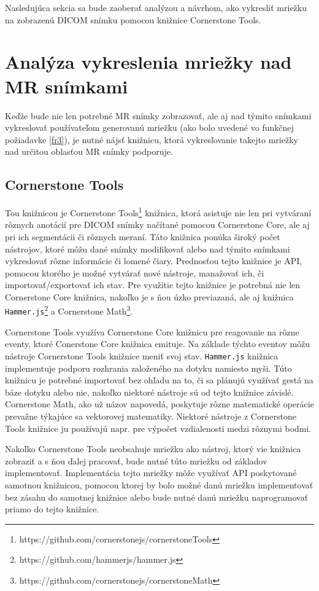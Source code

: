 Nasledujúca sekcia sa bude zaoberať analýzou a návrhom, ako vykresliť mriežku na zobrazenú DICOM snímku pomocou knižnice Cornerstone Tools.

\section {Analýza vykreslenia mriežky nad MR snímkami}
Keďže bude nie len potrebné MR snímky zobrazovať, ale aj nad týmito snímkami vykreslovať používateľom generovanú mriežku (ako bolo uvedené vo funkčnej požiadavke \ref{fr3}), je nutné nájsť knižnicu, ktorá vykresľovanie takejto mriežky nad určitou oblasťou MR snímky podporuje.

\subsection {Cornerstone Tools}
Tou knižnicou je Cornerstone Tools\footnote{https://github.com/cornerstonejs/cornerstoneTools} knižnica, ktorá asistuje nie len pri vytváraní rôznych anotácií pre DICOM snímky načítané pomocou Cornerstone Core, ale aj pri ich segmentácii či rôznych meraní. Táto knižnica ponúka široký počet nástrojov, ktoré môžu dané snímky modifikovať alebo nad týmito snímkami vykreslovať rôzne informácie či lomené čiary.
Prednosťou tejto knižnice je API, pomocou ktorého je možné vytvárať nové nástroje, manažovať ich, či importovať/exportovať ich stav. Pre využitie tejto knižnice je potrebná nie len Cornerstone Core knižnica, nakoľko je s ňou úzko previazaná, ale aj knižnica \texttt{Hammer.js}\footnote{https://github.com/hammerjs/hammer.js} a Cornerstone Math\footnote{https://github.com/cornerstonejs/cornerstoneMath}.

Cornerstone Tools využíva Cornerstone Core knižnicu pre reagovanie na rôzne eventy, ktoré Conerstone Core knižnica emituje. Na základe týchto eventov môžu nástroje Cornerstone Tools knižnice meniť svoj stav.
\texttt{Hammer.js} knižnica implementuje podporu rozhrania založeného na dotyku namiesto myši. Túto knižnicu je potrebné importovať bez ohľadu na to, či sa plánujú využívať gestá na báze dotyku alebo nie, nakoľko niektoré nástroje sú od tejto knižnice závislé.
Cornerstone Math, ako už názov napovedá, poskytuje rôzne matematické operácie prevažne týkajúce sa vektorovej matematiky. Niektoré nástroje z Cornerstone Tools knižnice ju používajú napr. pre výpočet vzdialenosti medzi rôznymi bodmi.

Nakoľko Cornerstone Tools neobsahuje mriežku ako nástroj, ktorý vie knižnica zobraziť a s ňou ďalej pracovať, bude nutné túto mriežku od základov implementovať. Implementácia tejto mriežky môže využívať API poskytované samotnou knižnicou, pomocou ktorej by bolo možné danú mriežku implementovať bez zásahu do samotnej knižnice alebo bude nutné danú mriežku naprogramovať priamo do tejto knižnice.

